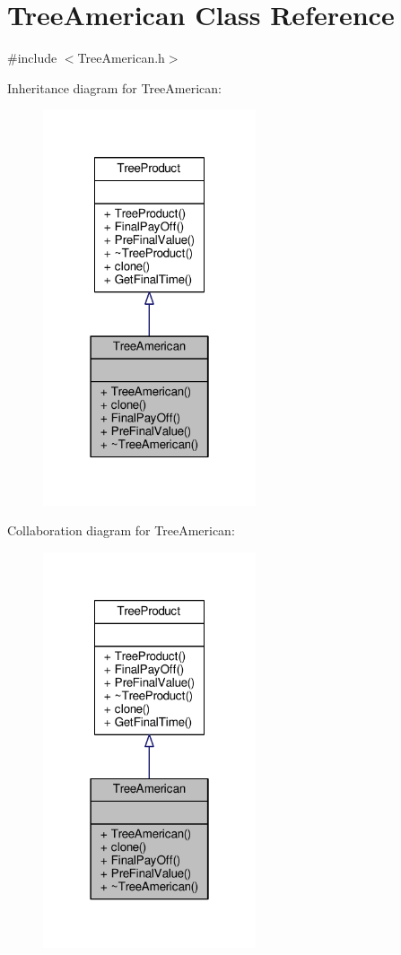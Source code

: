 \hypertarget{classTreeAmerican}{}\section{Tree\+American Class Reference}
\label{classTreeAmerican}


{\ttfamily \#include $<$Tree\+American.\+h$>$}



Inheritance diagram for Tree\+American\+:
\nopagebreak
\begin{figure}[H]
\begin{center}
\leavevmode
\includegraphics[width=178pt]{classTreeAmerican__inherit__graph}
\end{center}
\end{figure}


Collaboration diagram for Tree\+American\+:
\nopagebreak
\begin{figure}[H]
\begin{center}
\leavevmode
\includegraphics[width=178pt]{classTreeAmerican__coll__graph}
\end{center}
\end{figure}
